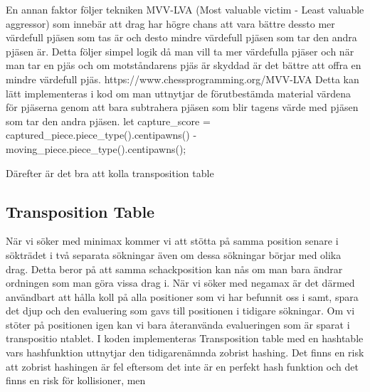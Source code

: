 \documentclass{article}
\begin{document}
En annan faktor följer tekniken MVV-LVA (Most valuable victim - Least valuable aggressor) som innebär att drag har högre chans att vara bättre dessto mer värdefull pjäsen som tas är och desto mindre värdefull pjäsen som tar den andra pjäsen är. Detta följer simpel logik då man vill ta mer värdefulla pjäser och när man tar en pjäs och om motståndarens pjäs är skyddad är det bättre att offra en mindre värdefull pjäs.
https://www.chessprogramming.org/MVV-LVA
Detta kan lätt implementeras i kod om man uttnytjar de förutbestämda material värdena för pjäserna genom att bara subtrahera pjäsen som blir tagens värde med pjäsen som tar den andra pjäsen.
let capture_score = captured_piece.piece_type().centipawns() - moving_piece.piece_type().centipawns();

Därefter är det bra att kolla transposition table


\subsection{Transposition Table}

När vi söker med minimax kommer vi att stötta på samma position senare i sökträdet i två separata sökningar även om dessa sökningar börjar med olika drag. Detta beror på att samma schackposition kan nås om man bara ändrar ordningen som man göra vissa drag i. När vi söker med negamax är det därmed användbart att hålla koll på alla positioner som vi har befunnit oss i samt, spara det djup och den evaluering som gavs till positionen i tidigare sökningar. Om vi stöter på positionen igen kan vi bara återanvända evalueringen som är sparat i transpositio ntablet. I koden implementeras Transposition table med en hashtable vars hashfunktion uttnytjar den tidigarenämnda zobrist hashing. Det finns en risk att zobrist hashingen är fel eftersom det inte är en perfekt hash funktion och det finns en risk för kollisioner, men

\begin{thebibliography}{9}

\end{thebibliography}
\end{document}
